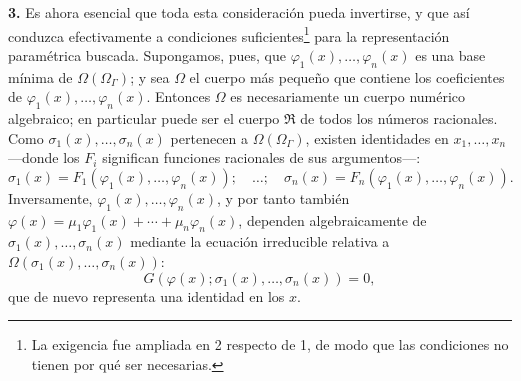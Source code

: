 \textbf{3.} Es ahora esencial que toda esta consideración pueda invertirse, y que así conduzca efectivamente a condiciones suficientes\footnote{La exigencia fue ampliada en 2 respecto de 1, de modo que las condiciones no tienen por qué ser necesarias.} para la representación paramétrica buscada. Supongamos, pues, que $\varphi_1(x),\ldots,\varphi_n(x)$ es una base mínima de $\Omega(\Omega_\Gamma)$; y sea $\Omega$ el cuerpo más pequeño que contiene los coeficientes de $\varphi_1(x),\ldots,\varphi_n(x)$. Entonces $\Omega$ es necesariamente un cuerpo numérico algebraico; en particular puede ser el cuerpo $\mathfrak R$ de todos los números racionales. Como $\sigma_1(x),\ldots,\sigma_n(x)$ pertenecen a $\Omega(\Omega_\Gamma)$, existen identidades en $x_1,
\ldots,x_n$ ---donde los $F_i$ significan funciones racionales de sus argumentos---:
\begin{equation}\tag{5}
\sigma_1(x)=F_1(\varphi_1(x),\ldots,\varphi_n(x));\quad\ldots;\quad
\sigma_n(x)=F_n(\varphi_1(x),\ldots,\varphi_n(x)).
\end{equation}
Inversamente, $\varphi_1(x),\ldots,\varphi_n(x)$, y por tanto también
$\varphi(x)=\mu_1\varphi_1(x)+\cdots+\mu_n\varphi_n(x)$, dependen algebraicamente de $\sigma_1(x),\ldots,\sigma_n(x)$ mediante la ecuación irreducible relativa a $\Omega(\sigma_1(x),\ldots,\sigma_n(x))$:
\begin{equation}\tag{6}
G(\varphi(x);\sigma_1(x),\ldots,\sigma_n(x))=0,
\end{equation}
que de nuevo representa una identidad en los $x$.

